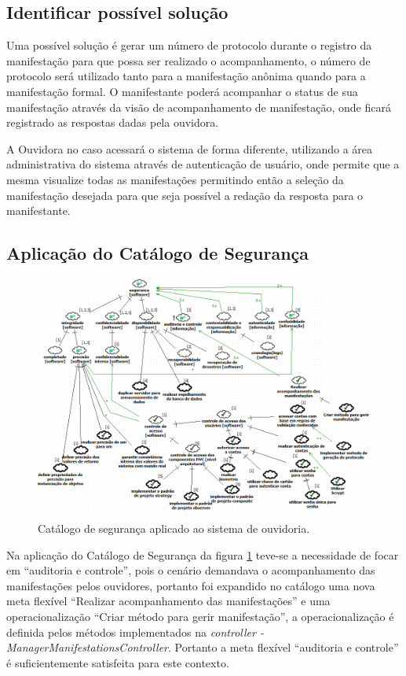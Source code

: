 \subsection{Identificar possível solução}

Uma possível solução é gerar um número de protocolo durante o registro da manifestação para que possa ser realizado o acompanhamento, o número de protocolo será utilizado tanto para a manifestação anônima quando para a manifestação formal. O manifestante poderá acompanhar o status de sua manifestação através da visão de acompanhamento de manifestação, onde ficará registrado as respostas dadas pela ouvidora.

A Ouvidora no caso acessará o sistema de forma diferente, utilizando a área administrativa do sistema através de autenticação de usuário, onde permite que a mesma visualize todas as manifestações permitindo então a seleção da manifestação desejada para que seja possível a redação da resposta para o manifestante.  


\subsection{Aplicação do Catálogo de Segurança}

\begin{figure}[h!]
	\centering
	\includegraphics[keepaspectratio=true,scale=0.65]{figuras/catalogoPersona2.PNG}
	\caption{Catálogo de segurança aplicado ao sistema de ouvidoria.}
	\label{catalogoPersona2}
\end{figure}



Na aplicação do Catálogo de Segurança da figura \ref{catalogoPersona2} teve-se a necessidade de focar em  “auditoria e controle”, pois o cenário demandava  o acompanhamento das manifestações pelos ouvidores, portanto foi expandido no catálogo uma nova meta flexível “Realizar acompanhamento das manifestações” e uma operacionalização “Criar método para gerir manifestação”, a operacionalização é definida pelos métodos implementados na \textit{controller - ManagerManifestationsController}. Portanto a meta flexível “auditoria e controle” é suficientemente satisfeita para este contexto.

